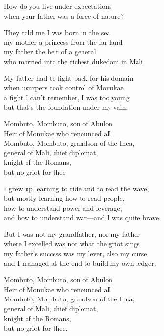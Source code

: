 \begin{lyrics}
How do you live under expectations\\
when your father was a force of nature?

They told me I was born in the sea\\
my mother a princess from the far land\\
my father the heir of a general\\
who married into the richest dukedom in Mali

My father had to fight back for his domain\\
when usurpers took control of Monukae\\
a fight I can't remember, I was too young\\
but that's the foundation under my vain.

Mombuto, Mombuto, son of Abulon\\
Heir of Monukae who renounced all\\
Mombuto, Mombuto, grandson of the Inca,\\
general of Mali, chief diplomat,\\
knight of the Romans,\\
but no griot for thee

I grew up learning to ride and to read the wave,\\
but mostly learning how to read people,\\
how to understand power and leverage,\\
and how to understand war—and I was quite brave.

But I was not my grandfather, nor my father\\
where I excelled was not what the griot sings\\
my father's success was my lever, also my curse\\
and I managed at the end to build my own ledger.

Mombuto, Mombuto, son of Abulon\\
Heir of Monukae who renounced all\\
Mombuto, Mombuto, grandson of the Inca,\\
general of Mali, chief diplomat,\\
knight of the Romans,\\
but no griot for thee.


\end{lyrics}
